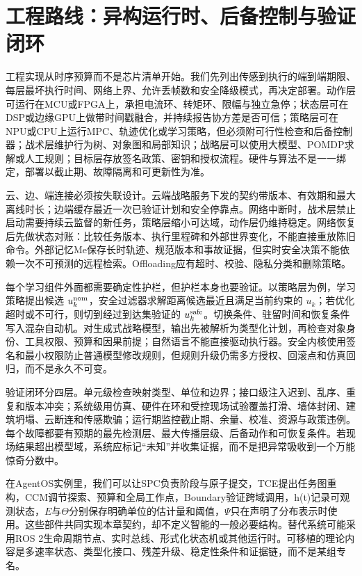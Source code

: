 \section{工程路线：异构运行时、后备控制与验证闭环}
\label{sec:engineering_roadmap_hardware}

工程实现从时序预算而不是芯片清单开始。我们先列出传感到执行的端到端期限、每层最坏执行时间、网络上界、允许丢帧数和安全降级模式，再决定部署。动作层可运行在MCU或FPGA上，承担电流环、转矩环、限幅与独立急停；状态层可在DSP或边缘GPU上做带时间戳融合，并持续报告协方差是否可信；策略层可在NPU或CPU上运行MPC、轨迹优化或学习策略，但必须附可行性检查和后备控制器；战术层维护行为树、对象图和局部知识；战略层可以使用大模型、POMDP求解或人工规则；目标层存放签名政策、密钥和授权流程。硬件与算法不是一一绑定，部署以截止期、故障隔离和可更新性为准。

云、边、端连接必须按失联设计。云端战略服务下发的契约带版本、有效期和最大离线时长；边端缓存最近一次已验证计划和安全停靠点。网络中断时，战术层禁止启动需要持续云监督的新任务，策略层缩小可达域，动作层仍维持稳定。网络恢复后先做状态对账：比较任务版本、执行里程碑和外部世界变化，不能直接重放陈旧命令。外部记忆Me保存长时轨迹、规范版本和事故证据，但实时安全决策不能依赖一次不可预测的远程检索。Offloading应有超时、校验、隐私分类和删除策略。

每个学习组件外面都需要确定性护栏，但护栏本身也要验证。以策略层为例，学习策略提出候选 $u_k^{\rm nom}$，安全过滤器求解距离候选最近且满足当前约束的 $u_k$；若优化超时或不可行，则切到经过到达集验证的 $u_k^{\rm safe}$。切换条件、驻留时间和恢复条件写入混杂自动机。对生成式战略模型，输出先被解析为类型化计划，再检查对象身份、工具权限、预算和因果前提；自然语言不能直接驱动执行器。安全内核使用签名和最小权限防止普通模型修改规则，但规则升级仍需多方授权、回滚点和仿真回归，而不是永久不可变。

验证闭环分四层。单元级检查映射类型、单位和边界；接口级注入迟到、乱序、重复和版本冲突；系统级用仿真、硬件在环和受控现场试验覆盖打滑、墙体封闭、建筑坍塌、云断连和传感欺骗；运行期监控截止期、余量、校准、资源与政策违例。每个故障都要有预期的最先检测层、最大传播层级、后备动作和可恢复条件。若现场结果超出模型域，系统应标记“未知”并收集证据，而不是把异常吸收到一个万能惊奇分数中。

在AgentOS实例里，我们可以让SPC负责阶段与原子提交，TCE提出任务图重构，CCM调节探索、预算和全局工作点，Boundary验证跨域调用，h(t)记录可观测状态，$E$与$\Theta$分别保存明确单位的估计量和阈值，$\Psi$只在声明了分布表示时使用。这些部件共同实现本章契约，却不定义智能的一般必要结构。替代系统可能采用ROS 2生命周期节点、实时总线、形式化状态机或其他运行时。可移植的理论内容是多速率状态、类型化接口、残差升级、稳定性条件和证据链，而不是某组专名。

